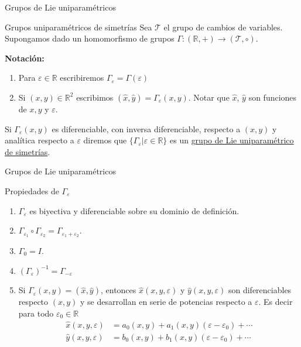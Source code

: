 \documentclass[handout,hyperref={colorlinks=true}]{beamer}
\newcommand{\rr}{\mathbb{R}}
\renewcommand{\emph}[1]{\textcolor[rgb]{1,0,0}{#1}}
\renewcommand{\epsilon}{\varepsilon}
\newcommand{\nl}{\onslide<+-> }
\begin{document}
\begin{frame}{Grupos de Lie uniparamétricos}
\nl\begin{block}{Grupos uniparamétricos de simetrías}
Sea $\mathscr{T}$ el grupo de cambios de variables. Supongamos dado un homomorfismo de grupos $\Gamma:(\rr,+)\to (\mathscr{T},\circ)$.  

\nl\textbf{Notación:} 
\begin{enumerate}
\item<+-> Para $\epsilon\in\rr$ escribiremos $\Gamma_{\epsilon}=\Gamma(\epsilon)$ 
\item<+> Si $(x,y)\in\rr^2$ escribimos $(\hat{x},\hat{y})=\Gamma_{\epsilon}(x,y)$. Notar que $\hat{x}$, $\hat{y}$ son funciones de $x,y$ y $\epsilon$.
\end{enumerate}
\nl Si $\Gamma_{\epsilon}(x,y)$ es diferenciable, con inversa diferenciable, respecto a $(x,y)$ y analítica respecto a $\epsilon$ diremos que $\{\Gamma_{\epsilon}|\epsilon\in\rr\}$ es un \href{http://es.wikipedia.org/wiki/Grupo_uniparamétrico}{\emph{grupo de Lie uniparamétrico de simetrías}}.
\end{block}


\end{frame}






\begin{frame}{Grupos de Lie uniparamétricos}
\nl\begin{block}{Propiedades de $\Gamma_{\epsilon}$}
\begin{enumerate}
\item<+->$\Gamma_{\epsilon}$ es biyectiva y diferenciable sobre su dominio de definición.
 \item<+-> $\Gamma_{\epsilon_1}\circ \Gamma_{\epsilon_2}=\Gamma_{\epsilon_1+\epsilon_2}$.

\item<+-> $\Gamma_0=I$.

\item<+-> $\left(\Gamma_{\epsilon}\right)^{-1}=\Gamma_{-\epsilon}$

\item<+-> Si $\Gamma_{\epsilon}(x,y)=(\hat{x},\hat{y})$, entonces  $\hat{x}(x,y,\epsilon)$ y $\hat{y}(x,y,\epsilon)$ son  diferenciables respecto $(x,y)$ y se desarrollan en serie de potencias respecto a $\epsilon$. Es decir para todo $\epsilon_0\in\rr$ 
\[
\begin{array}{cc}
\hat{x}(x,y,\epsilon)&=a_0(x,y)+a_1(x,y)(\epsilon- \epsilon_0)+\cdots\\
\hat{y}(x,y,\epsilon)&=b_0(x,y)+b_1(x,y)(\epsilon- \epsilon_0)+\cdots\\
\end{array}
\]

\end{enumerate}

\end{block}


\end{frame}
\end{document}
